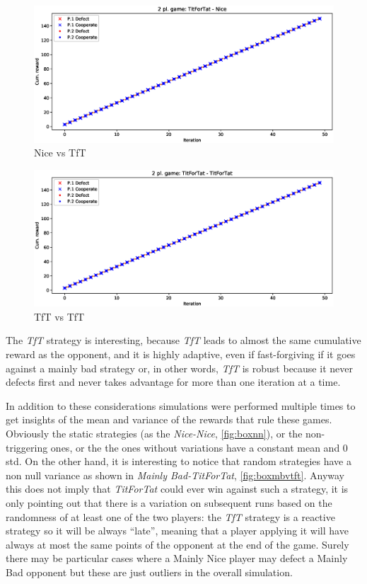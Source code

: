 \documentclass[journal,10pt,twoside]{IEEEtran}
\begin{document}
\begin{figure}[!ht]
    \centering
    \includegraphics[width=1\columnwidth]{../img/ipd2p/ipd2p-rewards-TitForTat-Nice}
    \caption{Nice vs TfT}
    \label{fig:nicevstft}
\end{figure}

\begin{figure}[!ht]
    \centering
    \includegraphics[width=1\columnwidth]{../img/ipd2p/ipd2p-rewards-TitForTat-TitForTat}
    \caption{TfT vs TfT}
    \label{fig:tftvstft}
\end{figure}

The \textit{TfT} strategy is interesting, because \textit{TfT} leads to almost the same cumulative reward as the opponent, and it is highly adaptive, even if fast-forgiving if it goes against a mainly bad strategy or, in other words, \textit{TfT} is robust because it never defects first and never takes advantage for more than one iteration at a time.~\cite{fogelEvolvingBehaviors}

In addition to these considerations simulations were performed multiple times to get insights of the mean and variance of the rewards that rule these games. Obviously the static strategies (as the \textit{Nice-Nice}, \autoref{fig:boxnn}), or the non-triggering ones, or the the ones without variations have a constant mean and $0$ std. On the other hand, it is interesting to notice that random strategies have a non null variance as shown in \textit{Mainly Bad-TitForTat}, \autoref{fig:boxmbvtft}. Anyway this does not imply that \textit{TitForTat} could ever win against such a strategy, it is only pointing out that there is a variation on subsequent runs based on the randomness of at least one of the two players: the \textit{TfT} strategy is a reactive strategy so it will be always ``late'', meaning that a player applying it will have always at most the same points of the opponent at the end of the game. Surely there may be particular cases where a Mainly Nice player may defect a Mainly Bad opponent but these are just outliers in the overall simulation.
\end{document}
